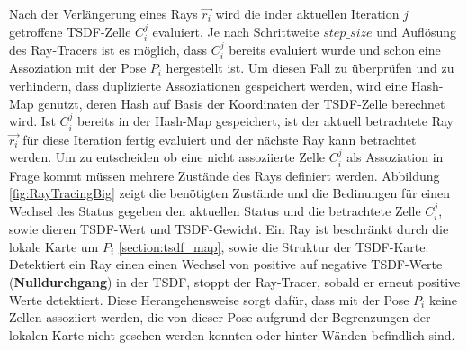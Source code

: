 Nach der Verlängerung eines Rays $\vec{r_i}$ wird die inder aktuellen Iteration $j$ getroffene TSDF-Zelle $C_i^j$ evaluiert. Je nach Schrittweite $step\_size$ und Auflösung des Ray-Tracers ist es möglich, dass $C_i^j$ bereits evaluiert wurde und schon eine Assoziation mit der Pose $P_i$ hergestellt ist. Um diesen Fall zu überprüfen und zu verhindern, dass duplizierte Assoziationen gespeichert werden, wird eine Hash-Map genutzt, deren Hash auf Basis der Koordinaten der TSDF-Zelle berechnet wird. Ist $C_i^j$ bereits in der Hash-Map gespeichert, ist der aktuell betrachtete Ray $\vec{r_i}$ für diese Iteration fertig evaluiert und der nächste Ray kann betrachtet werden. Um zu entscheiden ob eine nicht assoziierte Zelle $C_i^j$ als Assoziation in Frage kommt müssen mehrere Zustände des Rays definiert werden. Abbildung \ref{fig:RayTracingBig} zeigt die benötigten Zustände und die Bedinungen für einen Wechsel des Status gegeben den aktuellen Status und die betrachtete Zelle $C_i^j$, sowie dieren TSDF-Wert und TSDF-Gewicht. Ein Ray ist beschränkt durch die lokale Karte um $P_i$ \ref{section:tsdf_map}, sowie die Struktur der TSDF-Karte. Detektiert ein Ray einen einen Wechsel von positive auf negative TSDF-Werte (\textbf{Nulldurchgang}) in der TSDF, stoppt der Ray-Tracer, sobald er erneut positive Werte detektiert. Diese Herangehensweise sorgt dafür, dass mit der Pose $P_i$ keine Zellen assoziiert werden, die von dieser Pose aufgrund der Begrenzungen der lokalen Karte nicht gesehen werden konnten oder hinter Wänden befindlich sind.

